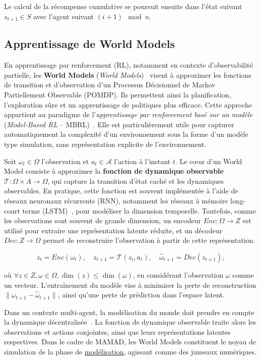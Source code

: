 \documentclass[pdflatex,sn-mathphys-num]{sn-jnl}%
\theoremstyle{thmstyleone}%
\theoremstyle{thmstyletwo}%
\theoremstyle{thmstylethree}%
\begin{document}
Le calcul de la récompense cumulative se poursuit ensuite dans l’état suivant $s_{t+1} \in S$ avec l’agent suivant $(i+1) \mod n$.

\subsection{Apprentissage de World Models}

En apprentissage par renforcement (RL), notamment en contexte d’observabilité partielle, les \textbf{World Models} (\textit{World Models})~\cite{ha2018recurrent} visent à approximer les fonctions de transition et d’observation d’un Processus Décisionnel de Markov Partiellement Observable (POMDP). Ils permettent ainsi la planification, l’exploration sûre et un apprentissage de politiques plus efficace. Cette approche appartient au paradigme de l’\textit{apprentissage par renforcement basé sur un modèle} (\textit{Model-Based RL} – MBRL)~\cite{moerland2020model}. Elle est particulièrement utile pour capturer automatiquement la complexité d’un environnement sous la forme d’un modèle type simulation, sans représentation explicite de l’environnement.

Soit $\omega_t \in \Omega$ l’observation et $a_t \in \mathcal{A}$ l’action à l’instant $t$. Le cœur d’un World Model consiste à approximer la \textbf{fonction de dynamique observable} $\mathcal{T}: \Omega \times A \rightarrow \Omega$, qui capture la transition d’état caché et les dynamiques observables. En pratique, cette fonction est souvent implémentée à l’aide de réseaux neuronaux récurrents (RNN), notamment les réseaux à mémoire long-court terme (LSTM)~\cite{hochreiter1997long}, pour modéliser la dimension temporelle. Toutefois, comme les observations sont souvent de grande dimension, un encodeur $Enc: \Omega \rightarrow Z$ est utilisé pour extraire une représentation latente réduite, et un décodeur $Dec: Z \rightarrow \Omega$ permet de reconstruire l’observation à partir de cette représentation.

\[
    z_t = Enc(\omega_t), \quad
    z_{t+1} = \mathcal{T}(z_t, a_t), \quad
    \hat{\omega}_{t+1} = Dec(z_{t+1}),
\]

où $\forall z \in Z, \omega \in \Omega, \dim(z) \leq \dim(\omega)$, en considérant l’observation $\omega$ comme un vecteur. L’entraînement du modèle vise à minimiser la perte de reconstruction $\|\omega_{t+1} - \hat{\omega}_{t+1}\|$, ainsi qu’une perte de prédiction dans l’espace latent.

Dans un contexte multi-agent, la modélisation du monde doit prendre en compte la dynamique décentralisée~\cite{yang2021representation}. La fonction de dynamique observable traite alors les observations et actions conjointes, ainsi que leurs représentations latentes respectives. Dans le cadre de MAMAD, les World Models constituent le noyau de simulation de la phase de \hyperref[sec:modelling]{modélisation}, agissant comme des jumeaux numériques.
\end{document}
